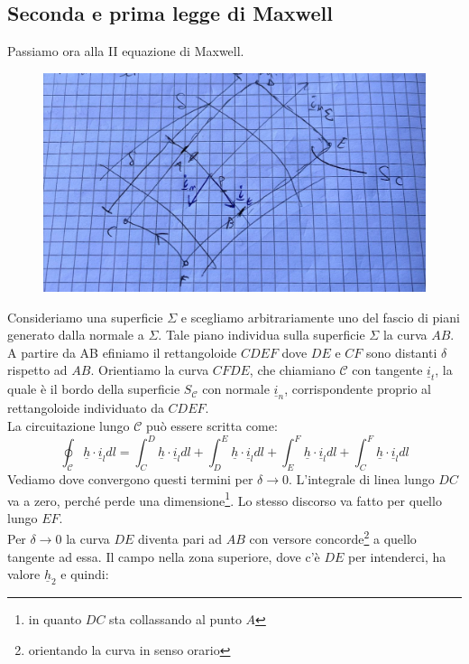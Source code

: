 \documentclass{book}
\begin{document}
        \subsection{Seconda e prima legge di Maxwell}
        Passiamo ora alla II equazione di Maxwell.
        \begin{figure}[h!]
            \centering
            \includegraphics[width=0.75\linewidth]{img//Chapter_one/chapt1img5age.png}
            \caption{}
        \end{figure}
        Consideriamo una superficie $\Sigma$ e scegliamo arbitrariamente uno del fascio di piani generato dalla normale a $\Sigma$. Tale piano individua sulla superficie $\Sigma$ la curva $AB$. A partire da AB efiniamo il rettangoloide $CDEF$ dove $DE$ e $CF$ sono distanti $\delta$ rispetto ad $AB$. Orientiamo la curva $CFDE$, che chiamiano $\mathcal{C}$ con tangente $\underline{i}_{t}$, la quale è il bordo della superficie $S_{\mathcal{C}}$ con normale $\underline{i}_{n}$, corrispondente proprio al rettangoloide individuato da $CDEF$. \\
        La circuitazione lungo $\mathcal{C}$ può essere scritta come:
        \begin{equation}
            \oint_{\mathcal C} \underline{h} \cdot \underline{i}_{l} dl = \int_{C} ^{D} \underline{h} \cdot \underline{i}_{l}dl + \int_{D} ^{E} \underline{h} \cdot \underline{i}_{l}dl +\int_{E} ^{F} \underline{h} \cdot \underline{i}_{l}dl +\int_{C} ^{F} \underline{h} \cdot \underline{i}_{l}dl  
        \end{equation}
        Vediamo dove convergono questi termini per $\delta \to 0$. L'integrale di linea lungo $DC$ va a zero, perché perde una dimensione\footnote{in quanto $DC$ sta collassando al punto $A$}. Lo stesso discorso va fatto per quello lungo $EF$.\\
        Per $\delta \to 0$ la curva $DE$ diventa pari ad $AB$ con versore concorde\footnote{orientando la curva in senso orario} a quello tangente ad essa. Il campo nella zona superiore, dove c'è $DE$ per intenderci, ha valore $\underline{h}_{2}$ e quindi:
\end{document}
